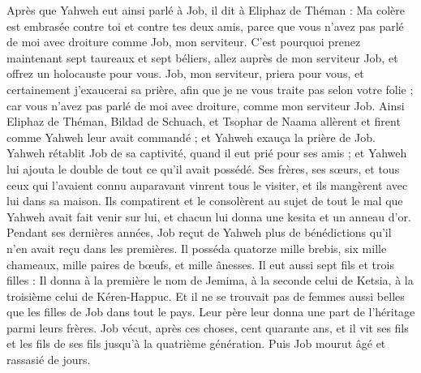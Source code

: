 \begin{multicols}{2}
Après que Yahweh eut ainsi parlé à Job, il dit à Eliphaz de Théman : Ma colère est embrasée contre toi et contre tes deux amis, parce que vous n'avez pas parlé de moi avec droiture comme Job, mon serviteur.
 C'est pourquoi prenez maintenant sept taureaux et sept béliers, allez auprès de mon serviteur Job, et offrez un holocauste pour vous. Job, mon serviteur, priera pour vous, et certainement j'exaucerai sa prière, afin que je ne vous traite pas selon votre folie ; car vous n'avez pas parlé de moi avec droiture, comme mon serviteur Job.
 Ainsi Eliphaz de Théman, Bildad de Schuach, et Tsophar de Naama allèrent et firent comme Yahweh leur avait commandé ; et Yahweh exauça la prière de Job.
Yahweh rétablit Job de sa captivité, quand il eut prié pour ses amis ; et Yahweh lui ajouta le double de tout ce qu'il avait possédé.
Ses frères, ses sœurs, et tous ceux qui l'avaient connu auparavant vinrent tous le visiter, et ils mangèrent avec lui dans sa maison. Ils compatirent et le consolèrent au sujet de tout le mal que Yahweh avait fait venir sur lui, et chacun lui donna une kesita et un anneau d'or.
Pendant ses dernières années, Job reçut de Yahweh plus de bénédictions qu'il n'en avait reçu dans les premières. Il posséda quatorze mille brebis, six mille chameaux, mille paires de bœufs, et mille ânesses.
Il eut aussi sept fils et trois filles :
Il donna à la première le nom de Jemima, à la seconde celui de Ketsia, à la troisième celui de Kéren-Happuc.
Et il ne se trouvait pas de femmes aussi belles que les filles de Job dans tout le pays. Leur père leur donna une part de l'héritage parmi leurs frères.
Job vécut, après ces choses, cent quarante ans, et il vit ses fils et les fils de ses fils jusqu'à la quatrième génération.
Puis Job mourut âgé et rassasié de jours.
\PPE{}
\end{multicols}
